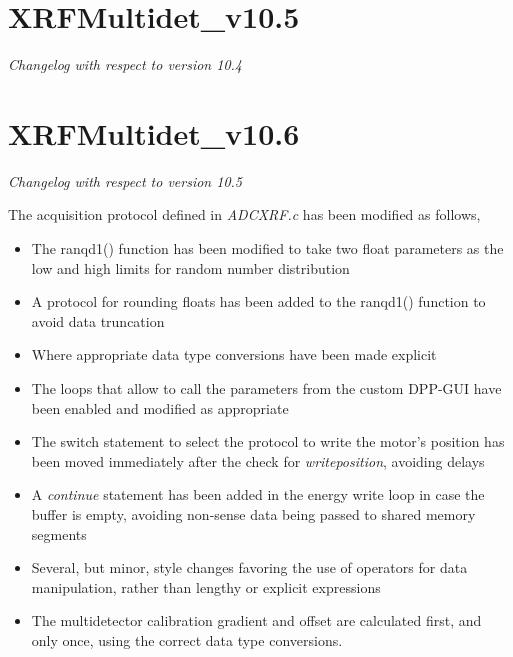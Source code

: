 \documentclass[a4paper,12pt]{article}
\begin{document}
\section{XRFMultidet\_v10.5}
\textit{Changelog with respect to version 10.4}



\section{XRFMultidet\_v10.6}
\textit{Changelog with respect to version 10.5}

The acquisition protocol defined in \textit{ADCXRF.c} has been modified as follows,
\begin{itemize}
	\item The ranqd1() function has been modified to take two float parameters as the low and high limits for random number distribution
	\item A protocol for rounding floats has been added to the ranqd1() function to avoid data truncation
	\item Where appropriate data type conversions have been made explicit
	\item The loops that allow to call the parameters from the custom DPP-GUI have been enabled and modified as appropriate
	\item The switch statement to select the protocol to write the motor's position has been moved immediately after the check for \textit{writeposition}, avoiding delays
	\item A \textit{continue} statement has been added in the energy write loop in case the buffer is empty, avoiding non-sense data being passed to shared memory segments
	\item Several, but minor, style changes favoring the use of operators for data manipulation, rather than lengthy or explicit expressions
	\item The multidetector calibration gradient and offset are calculated first, and only once, using the correct data type conversions.
\end{itemize}
\end{document}
